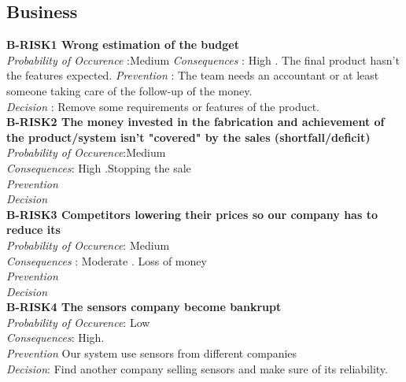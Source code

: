 \subsection{Business}
	\textbf{ B-RISK1 Wrong estimation of the budget} \\
	\textit{Probability of Occurence} :Medium
	\textit{Consequences} : High . The final product hasn't the features expected.
	\textit{Prevention} : The team needs an accountant or at least someone taking care of the follow-up of the money. \\
	\textit{Decision} : Remove some requirements or features of the product. \\

	\textbf{ B-RISK2 The money invested in the fabrication and achievement of the product/system isn't "covered" by the sales (shortfall/deficit)} \\
	\textit{Probability of Occurence}:Medium \\
	\textit{Consequences}: High .Stopping the sale \\
	\textit{Prevention} \\
	\textit{Decision} \\
	
	\textbf{ B-RISK3 Competitors lowering their prices so our company has to reduce its} \\
	\textit{Probability of Occurence}: Medium \\
	\textit{Consequences} : Moderate . Loss of money \\
	\textit{Prevention} \\
	\textit{Decision} \\
	
	\textbf{ B-RISK4 The sensors company become bankrupt} \\
	\textit{Probability of Occurence}: Low \\
	
	\textit{Consequences}: High.\\
	\textit{Prevention} Our system use sensors from different companies \\
	\textit{Decision}: Find another company selling sensors and make sure of its reliability. \\

